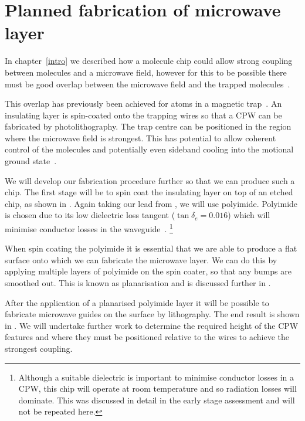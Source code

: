 \section{Planned fabrication of microwave layer}
\label{fab:planned}

In chapter~\ref{intro} 
we described how a molecule chip could allow strong coupling between \CaF{}
molecules and a microwave field, however for this to be possible there must be
good overlap between the microwave field and the trapped
molecules~\cite{Andre2006}.
%

This overlap has previously been achieved for atoms in a magnetic
trap~\cite{Treutlein2008}. An insulating layer is spin-coated onto the trapping
wires so that a CPW  can be fabricated by
photolithography. The trap centre can be positioned in the region where the
microwave field is strongest. This has potential to allow coherent control of
the molecules and potentially even sideband cooling into the motional ground
state~\cite{Andre2006}.
%

We will develop our fabrication procedure further so that we can produce such a
chip. The first stage will be to spin coat the insulating layer on top of an
etched chip, as shown in . Again taking our
lead from , we will use polyimide. Polyimide is chosen
due to its low dielectric loss tangent ($\tan\delta_e = 0.016$) which will
minimise conductor losses in the waveguide~\cite{Collin2007, Simons2004}.
\footnote{Although a suitable dielectric is important to minimise conductor
losses in a CPW, this chip will operate at room temperature and so radiation
losses will dominate. This was discussed in detail in the early stage
assessment and will not be repeated here.}
%

When spin coating the polyimide it is essential that we are able to produce a
flat surface onto which we can fabricate the microwave layer. We can do this by
applying multiple layers of polyimide on the spin coater, so that any bumps are
smoothed out. This is known as planarisation and is discussed further in
.

After the application of a planarised polyimide layer it will be possible to
fabricate microwave guides on the surface by lithography. The end result is
shown in . We will undertake further work to
determine the required height of the CPW features and where they must be
positioned relative to the wires to achieve the strongest coupling.

